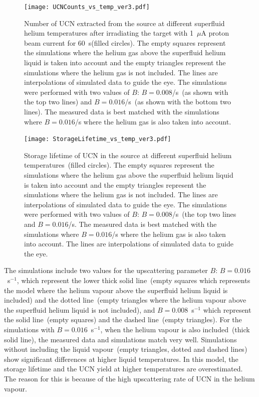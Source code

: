 \begin{figure}[h!]
  \centering
  \texttt{[image: UCNCounts\_vs\_temp\_ver3.pdf]}
  \caption[UCN yield versus superfluid helium temperature data and
  simulations]{Number of UCN extracted from the source at different
    superfluid helium temperatures after irradiating the target with
    1~$\mu$A proton beam current for 60~s(filled circles). The empty
    squares represent the simulations where the helium gas above the
    superfluid helium liquid is taken into account and the empty
    triangles represent the simulations where the helium gas is not
    included. The lines are interpolations of simulated data to guide
    the eye. The simulations were performed with two values of $B$:
    $B = 0.008$/s~(as shown with the top two lines) and
    $B = 0.016$/s~(as shown with the bottom two lines). The measured
    data is best matched with the simulations where $B = 0.016$/s
    where the helium gas is also taken into account.}
  \label{fig:Counts_vs_temp_sim}
\end{figure}

\begin{figure}[h!]
  \centering
  \texttt{[image: StorageLifetime\_vs\_temp\_ver3.pdf]}
  \caption[UCN storage lifetime versus superfluid helium temperature
  data and simulations]{Storage lifetime of UCN in the source at
    different superfluid helium temperatures~(filled circles).  The
    empty squares represent the simulations where the helium gas above
    the superfluid helium liquid is taken into account and the empty
    triangles represent the simulations where the helium gas is not
    included. The lines are interpolations of simulated data to guide
    the eye. The simulations were performed with two values of $B$:
    $B = 0.008$/s~(the top two lines and $B = 0.016$/s. The measured
    data is best matched with the simulations where $B = 0.016$/s
    where the helium gas is also taken into account.  The lines are
    interpolations of simulated data to guide the eye.}
  \label{fig:storage_vs_temp_sim}
\end{figure}

The simulations include two values for the upscattering parameter $B$:
$B= 0.016$~s$^{-1}$, which represent the lower thick solid line~(empty
squares which represents the model where the helium vapour above the
superfluid helium liquid is included) and the dotted line~(empty
triangles where the helium vapour above the superfluid helium liquid
is not included), and $B= 0.008$~s$^{-1}$ which represent the solid
line~(empty squares) and the dashed line~(empty triangles). For the
simulations with $B= 0.016$~s$^{-1}$, when the helium vapour is also
included~(thick solid line), the measured data and simulations match
very well. Simulations without including the liquid vapour~(empty
triangles, dotted and dashed lines) show significant differences at higher liquid
temperatures. In this model, the storage lifetime and the UCN yield at
higher temperatures are overestimated. The reason for this is because
of the high upscattering rate of UCN in the helium vapour.



